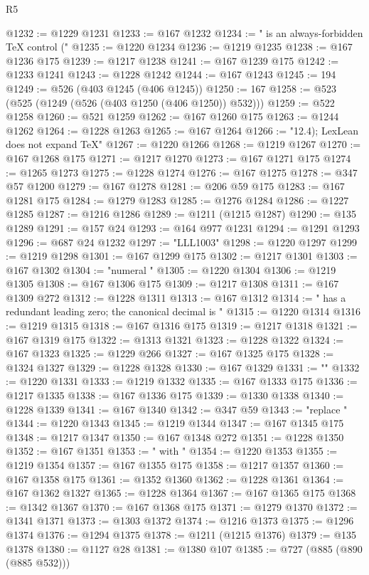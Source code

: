 \begin{lexlean}{R5}
\begin{coremodule}
@1232 := @1229 @1231
@1233 := @167 @1232
@1234 := " is an always-forbidden TeX control ("
@1235 := @1220 @1234
@1236 := @1219 @1235
@1238 := @167 @1236 @175
@1239 := @1217 @1238
@1241 := @167 @1239 @175
@1242 := @1233 @1241
@1243 := @1228 @1242
@1244 := @167 @1243
@1245 := 194
@1249 := @526 (@403 @1245 (@406 @1245))
@1250 := 167
@1258 := @523 (@525 (@1249 (@526 (@403 @1250 (@406 @1250)) @532)))
@1259 := @522 @1258
@1260 := @521 @1259
@1262 := @167 @1260 @175
@1263 := @1244 @1262
@1264 := @1228 @1263
@1265 := @167 @1264
@1266 := "12.4); LexLean does not expand TeX"
@1267 := @1220 @1266
@1268 := @1219 @1267
@1270 := @167 @1268 @175
@1271 := @1217 @1270
@1273 := @167 @1271 @175
@1274 := @1265 @1273
@1275 := @1228 @1274
@1276 := @167 @1275
@1278 := @347 @57 @1200
@1279 := @167 @1278
@1281 := @206 @59 @175
@1283 := @167 @1281 @175
@1284 := @1279 @1283
@1285 := @1276 @1284
@1286 := @1227 @1285
@1287 := @1216 @1286
@1289 := @1211 (@1215 @1287)
@1290 := @135 @1289
@1291 := @157 @24
@1293 := @164 @977 @1231
@1294 := @1291 @1293
@1296 := @687 @24 @1232
@1297 := "LLL1003"
@1298 := @1220 @1297
@1299 := @1219 @1298
@1301 := @167 @1299 @175
@1302 := @1217 @1301
@1303 := @167 @1302
@1304 := "numeral "
@1305 := @1220 @1304
@1306 := @1219 @1305
@1308 := @167 @1306 @175
@1309 := @1217 @1308
@1311 := @167 @1309 @272
@1312 := @1228 @1311
@1313 := @167 @1312
@1314 := " has a redundant leading zero; the canonical decimal is "
@1315 := @1220 @1314
@1316 := @1219 @1315
@1318 := @167 @1316 @175
@1319 := @1217 @1318
@1321 := @167 @1319 @175
@1322 := @1313 @1321
@1323 := @1228 @1322
@1324 := @167 @1323
@1325 := @1229 @266
@1327 := @167 @1325 @175
@1328 := @1324 @1327
@1329 := @1228 @1328
@1330 := @167 @1329
@1331 := ""
@1332 := @1220 @1331
@1333 := @1219 @1332
@1335 := @167 @1333 @175
@1336 := @1217 @1335
@1338 := @167 @1336 @175
@1339 := @1330 @1338
@1340 := @1228 @1339
@1341 := @167 @1340
@1342 := @347 @59
@1343 := "replace "
@1344 := @1220 @1343
@1345 := @1219 @1344
@1347 := @167 @1345 @175
@1348 := @1217 @1347
@1350 := @167 @1348 @272
@1351 := @1228 @1350
@1352 := @167 @1351
@1353 := " with "
@1354 := @1220 @1353
@1355 := @1219 @1354
@1357 := @167 @1355 @175
@1358 := @1217 @1357
@1360 := @167 @1358 @175
@1361 := @1352 @1360
@1362 := @1228 @1361
@1364 := @167 @1362 @1327
@1365 := @1228 @1364
@1367 := @167 @1365 @175
@1368 := @1342 @1367
@1370 := @167 @1368 @175
@1371 := @1279 @1370
@1372 := @1341 @1371
@1373 := @1303 @1372
@1374 := @1216 @1373
@1375 := @1296 @1374
@1376 := @1294 @1375
@1378 := @1211 (@1215 @1376)
@1379 := @135 @1378
@1380 := @1127 @28
@1381 := @1380 @107
@1385 := @727 (@885 (@890 (@885 @532)))

\end{coremodule}
\end{lexlean}
